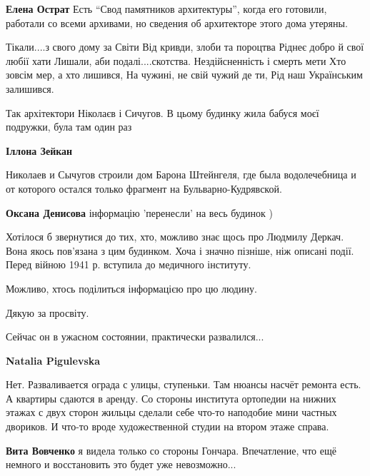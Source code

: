 \begin{itemize}
\begin{itemize} %
\textbf{Елена Острат} Есть \enquote{Свод памятников архитектуры}, когда его готовили, работали со всеми архивами, но сведения об архитекторе этого дома утеряны.
\end{itemize} %


\obeycr
Тікали....з свого дому за Світи
Від кривди, злоби та пороцтва
Ріднеє добро й свої любії хати
Лишали, аби подалі....скотства.
Нездійсненність і смерть мети
Хто зовсім мер, а хто лишився,
На чужині, не свій чужий де ти,
Рід наш Українським залишився.
\restorecr


Так архітектори Ніколаєв і Сичугов. В цьому будинку жила бабуся моєї подружки, була там один раз

\begin{itemize} %
\textbf{Іллона Зейкан} 

Николаев и Сычугов строили дом Барона Штейнгеля, где была водолечебница и от
которого остался только фрагмент на Бульварно-Кудрявской.

\textbf{Оксана Денисова} інформацію 'перенесли' на весь будинок )
\end{itemize} %


Хотілося б звернутися до тих, хто, можливо знає щось про Людмилу Деркач. Вона
якось пов'язана з цим будинком. Хоча і значно пізніше, ніж описані події. Перед
війною 1941 р. вступила до медичного інституту.

Можливо, хтось поділиться інформацією про цю людину.

Дякую за просвіту.

Сейчас он в ужасном состоянии, практически развалился...

\begin{itemize} %
\textbf{Natalia Pigulevska} 

Нет. Разваливается ограда с улицы, ступеньки. Там нюансы насчёт ремонта есть. А
квартиры сдаются в аренду. Со стороны института ортопедии на нижних этажах с
двух сторон жильцы сделали себе что-то наподобие мини частных двориков. И
что-то вроде художественной студии на втором этаже справа.

\begin{itemize} %
\textbf{Вита Вовченко} я видела только со стороны Гончара. Впечатление, что ещё немного и восстановить это будет уже невозможно...


\end{itemize}
\end{itemize}
\end{itemize}
